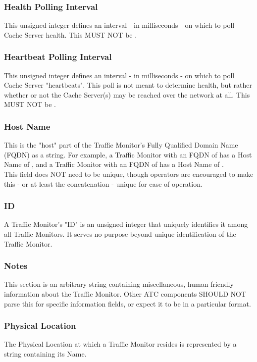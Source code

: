 \subsubsection{Health Polling Interval}
This unsigned integer defines an interval - in milliseconds - on which to poll
Cache Server health. This MUST NOT be .

\subsubsection{Heartbeat Polling Interval}
This unsigned integer defines an interval - in milliseconds - on which to poll
Cache Server "heartbeats". This poll is not meant to determine health, but
rather whether or not the Cache Server(s) may be reached over the network at
all. This MUST NOT be .

\subsubsection{Host Name}
This is the "host" part of the Traffic Monitor's Fully Qualified Domain Name
(FQDN) as a string. For example, a Traffic Monitor with an FQDN of
 has a Host Name of , and a Traffic Monitor with an
FQDN of  has a Host Name of
.\\
This field does NOT need to be unique, though operators are encouraged to make
this - or at least the concatenation  - unique
for ease of operation.

\subsubsection{ID}
A Traffic Monitor's "ID" is an unsigned integer that uniquely identifies it
among all Traffic Monitors. It serves no purpose beyond unique identification of
the Traffic Monitor.

\subsubsection{Notes}
This section is an arbitrary string containing miscellaneous, human-friendly
information about the Traffic Monitor. Other ATC components SHOULD NOT parse
this for specific information fields, or expect it to be in a particular
format.

\subsubsection{Physical Location}
The Physical Location at which a Traffic Monitor resides is represented by a
string containing its Name.

